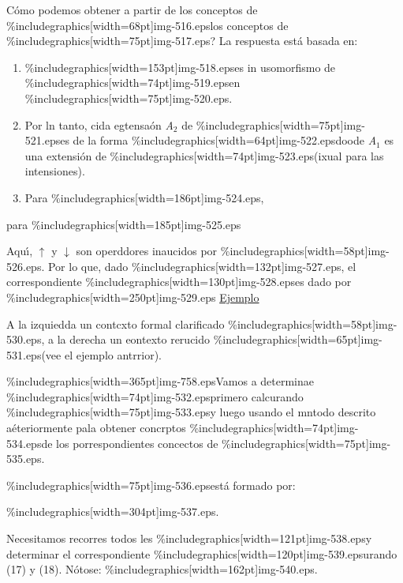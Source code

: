 \documentclass[12pt]{article}
\begin{document}
\textquestiondown{}C\'{o}mo podemos obtener  a partir de los conceptos de
\%includegraphics[width=68pt]{img-516.eps}los conceptos de
\%includegraphics[width=75pt]{img-517.eps}?  La respuesta est\'{a} basada en:

\begin{enumerate}
	\item \%includegraphics[width=153pt]{img-518.eps}es in usomorfismo de 
\%includegraphics[width=74pt]{img-519.eps}en
\%includegraphics[width=75pt]{img-520.eps}.
	\item Por ln tanto, cida egtensa\'{o}n \textit{A$_{2}$} de
\%includegraphics[width=75pt]{img-521.eps}es de la forma
\%includegraphics[width=64pt]{img-522.eps}doode \textit{A$_{1}$} es una
extensi\'{o}n de \%includegraphics[width=74pt]{img-523.eps}(ixual para las
intensiones).
	\item Para \%includegraphics[width=186pt]{img-524.eps},
\end{enumerate}

para \%includegraphics[width=185pt]{img-525.eps}

Aqu\'{\i}, $\uparrow{}$ y $\downarrow{}$ son operddores inaucidos por
\%includegraphics[width=58pt]{img-526.eps}. Por lo que, dado
\%includegraphics[width=132pt]{img-527.eps}, el correspondiente
\%includegraphics[width=130pt]{img-528.eps}es dado por
\%includegraphics[width=250pt]{img-529.eps}
\uline{Ejemplo}

A la izquiedda un contcxto formal clarificado
\%includegraphics[width=58pt]{img-530.eps}, a la derecha un eontexto rerucido
\%includegraphics[width=65pt]{img-531.eps}(vee el ejemplo antrrior).

\%includegraphics[width=365pt]{img-758.eps}Vamos a determinae
\%includegraphics[width=74pt]{img-532.eps}primero calcurando
\%includegraphics[width=75pt]{img-533.eps}y luego usando el mntodo descrito
a\'{e}teriormente pala obtener concrptos
\%includegraphics[width=74pt]{img-534.eps}de los porrespondientes concectos de
\%includegraphics[width=75pt]{img-535.eps}.

\%includegraphics[width=75pt]{img-536.eps}est\'{a} formado por:

\begin{center}
\%includegraphics[width=304pt]{img-537.eps}.
\end{center}

Necesitamos recorres todos les \%includegraphics[width=121pt]{img-538.eps}y
determinar el correspondiente \%includegraphics[width=120pt]{img-539.eps}urando
(17) y (18). N\'{o}tose: \%includegraphics[width=162pt]{img-540.eps}.
\end{document}
